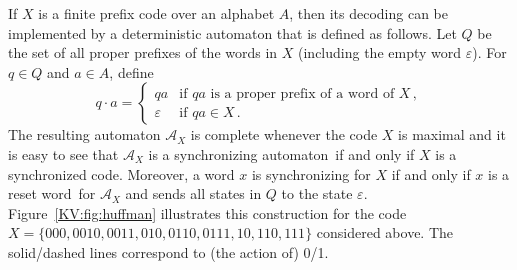 \documentclass{irmaart}
\newcommand{\san}{synchronizing au\-tom\-a\-ton}
\newcommand{\sw}{reset word}
\begin{document}
If $X$ is a finite prefix code over an alphabet $A$, then its
decoding can be implemented by a deterministic automaton that is
defined as follows. Let $Q$ be the set of all proper prefixes of
the words in $X$ (including the empty word $\varepsilon$). For
$q\in Q$ and $a\in A$, define
\begin{displaymath}
q\cdot a =\begin{cases} qa & \text{if $qa$ is a proper prefix of a word of $X$}\,,\\
\varepsilon & \text{if $qa \in X$}\,.\end{cases}
\end{displaymath}
The resulting automaton $\mathcal{A}_X$ is complete whenever the code $X$
is maximal and it is easy to see that $\mathcal{A}_X$ is a \san\ if and only
if $X$ is a synchronized code. Moreover, a word $x$ is synchronizing for $X$
if and only if $x$ is a \sw\ for $\mathcal{A}_X$ and sends all states in $Q$
to the state $\varepsilon$. Figure~\ref{KV:fig:huffman} illustrates this construction
for the code $X=\{000,0010,0011,010,0110,0111,10,110,111\}$ considered above.
The solid/dashed lines correspond to (the action of) 0/1.
\end{document}
